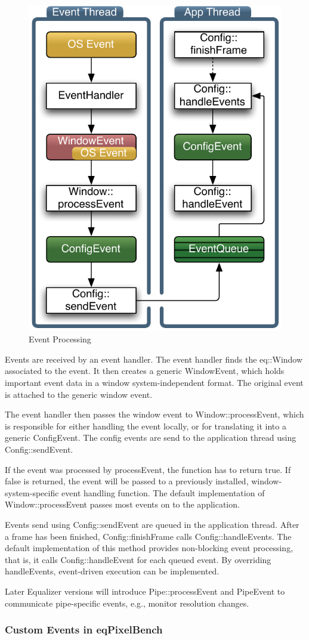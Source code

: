 \documentclass[10pt,a4]{scrartcl}
\begin{document}
\begin{figure}
  \includegraphics[width=.382\textwidth]{images/eventFilter.pdf}
  {\caption{\small\label{fEventProcessing}Event Processing}}
\end{figure}
Events are received by an event handler. The event handler finds the
\textsf{eq::Window} associated to the event. It then creates a generic
\textsf{WindowEvent}, which holds important event data in a 
window system-independent format. The original event is attached to the
generic window event.

The event handler then passes the window event to
\textsf{Window::processEvent}, which is responsible for either handling
the event locally, or for translating it into a generic
\textsf{ConfigEvent}. The config events are send to the application
thread using \textsf{Config::sendEvent}. 

If the event was processed by \textsf{processEvent}, the function has to
return \textsf{true}. If \textsf{false} is returned, the event will be
passed to a previously installed, window-system-specific event handling
function. The default implementation of \textsf{Window::processEvent}
passes most events on to the application.

Events send using \textsf{Config::sendEvent} are queued in the
application thread. After a frame has been finished,
\textsf{Config::finishFrame} calls \textsf{Config::handleEvents}. The
default implementation of this method provides non-blocking event
processing, that is, it calls \textsf{Config::handleEvent} for each
queued event. By overriding \textsf{handleEvents}, event-driven
execution can be implemented.

Later Equalizer versions will introduce \textsf{Pipe::processEvent} and
\textsf{PipeEvent} to communicate pipe-specific events, e.g., monitor
resolution changes.

\subsubsection{Custom Events in eqPixelBench}
\end{document}

